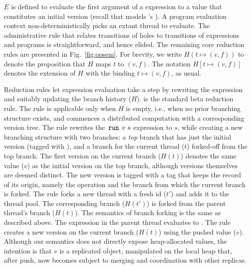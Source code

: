 $E$ is defined to evaluate the first argument of a  expression
to a value that constitutes an initial version (recall that 
models \nameMonad's ). A program evaluation
context non-deterministically picks an extant thread to evaluate. The
administrative rule that relates transitions of holes to transitions
of expressions and programs is straightforward, and hence elided. The
remaining core reduction rules are presented in
Fig.~\ref{fig:opsem}. For brevity, we write $H(t\mapsto (v,f))$ to
denote the proposition that $H$ maps $t$ to $(v,f)$. The notation $H[t
  \mapsto (v,f)]$ denotes the extension of $H$ with the binding $t
\mapsto (v,f)$, as usual.

Reduction rules let expression evaluation take a step by rewriting the
expression and suitably updating the branch history ($H$).
 is the standard beta reduction rule.  The
 rule is applicable only when $H$ is empty, i.e.,
when no prior branching structure exists, and commences a distributed
computation with a corresponding version tree. The rule rewrites the
$\,{\tt run}\,\;v\;s$ expression to $s$, while creating a new branching
structure with two branches: a \emph{top} branch that has just the
initial version (tagged with ), and a branch for the current
thread ($t$) forked-off from the top branch.  The first version on the
current branch ($H(t)$) denotes the same value ($v$) as the initial
version on the top branch, although versions themselves are deemed
distinct. The new version is tagged with a  tag that keeps the
record of its origin, namely the  operation and the branch from
which the current branch is forked. The  rule forks
a new thread with a fresh id ($t'$) and adds it to the thread pool.
The corresponding branch ($H(t')$) is forked from the parent thread's
branch ($H(t)$). The semantics of branch forking is the same as
described above. The  expression in the parent thread
evaluates to \C{()}. The  rule creates a new version
on the current branch ($H(t)$) using the pushed value ($v$).  Although
our semantics does not directly expose heap-allocated values, the
intention is that $v$ is a replicated object, manipulated on the local
heap that, after push, now becomes subject to merging and coordination
with other replicas.

